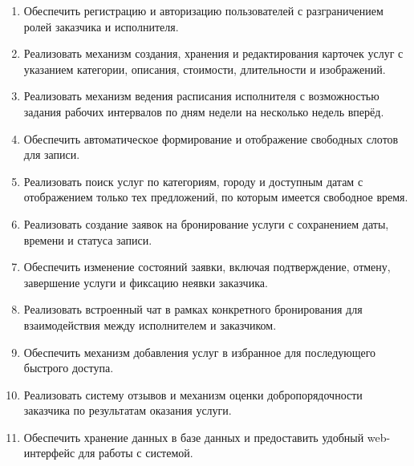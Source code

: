 \begin{enumerate}
	\item Обеспечить регистрацию и авторизацию пользователей с разграничением ролей заказчика и исполнителя.
	\item Реализовать механизм создания, хранения и редактирования карточек услуг с указанием категории, описания, стоимости, длительности и изображений.
	\item Реализовать механизм ведения расписания исполнителя с возможностью задания рабочих интервалов по дням недели на несколько недель вперёд.
	\item Обеспечить автоматическое формирование и отображение свободных слотов для записи.
	\item Реализовать поиск услуг по категориям, городу и доступным датам с отображением только тех предложений, по которым имеется свободное время.
	\item Реализовать создание заявок на бронирование услуги с сохранением даты, времени и статуса записи.
	\item Обеспечить изменение состояний заявки, включая подтверждение, отмену, завершение услуги и фиксацию неявки заказчика.
	\item Реализовать встроенный чат в рамках конкретного бронирования для взаимодействия между исполнителем и заказчиком.
	\item Обеспечить механизм добавления услуг в избранное для последующего быстрого доступа.
	\item Реализовать систему отзывов и механизм оценки добропорядочности заказчика по результатам оказания услуги.
	\item Обеспечить хранение данных в базе данных и предоставить удобный web-интерфейс для работы с системой.
\end{enumerate}